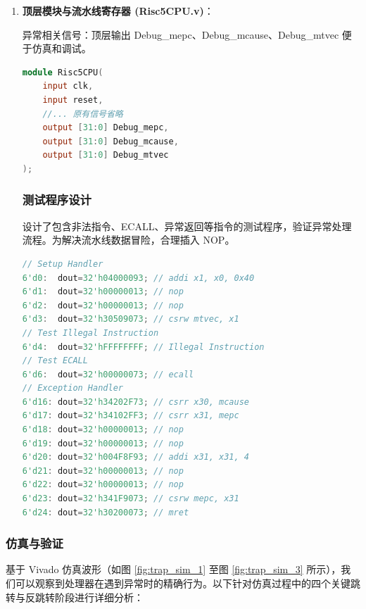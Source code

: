 \documentclass[12pt,a4paper]{article}
\begin{document}
\begin{enumerate}
    \item \textbf{顶层模块与流水线寄存器 (Risc5CPU.v)}：
   
    异常相关信号：顶层输出 Debug\_mepc、Debug\_mcause、Debug\_mtvec 便于仿真和调试。

\begin{lstlisting}[language=verilog]
module Risc5CPU(
    input clk,
    input reset,
    //... 原有信号省略
    output [31:0] Debug_mepc,
    output [31:0] Debug_mcause,
    output [31:0] Debug_mtvec
);
\end{lstlisting}

\clearpage
\subsubsection{测试程序设计}

 设计了包含非法指令、ECALL、异常返回等指令的测试程序，验证异常处理流程。为解决流水线数据冒险，合理插入 NOP。

\begin{lstlisting}[language=verilog]
// Setup Handler
6'd0:  dout=32'h04000093; // addi x1, x0, 0x40
6'd1:  dout=32'h00000013; // nop
6'd2:  dout=32'h00000013; // nop
6'd3:  dout=32'h30509073; // csrw mtvec, x1
// Test Illegal Instruction
6'd4:  dout=32'hFFFFFFFF; // Illegal Instruction
// Test ECALL
6'd6:  dout=32'h00000073; // ecall
// Exception Handler
6'd16: dout=32'h34202F73; // csrr x30, mcause
6'd17: dout=32'h34102FF3; // csrr x31, mepc
6'd18: dout=32'h00000013; // nop
6'd19: dout=32'h00000013; // nop
6'd20: dout=32'h004F8F93; // addi x31, x31, 4
6'd21: dout=32'h00000013; // nop
6'd22: dout=32'h00000013; // nop
6'd23: dout=32'h341F9073; // csrw mepc, x31
6'd24: dout=32'h30200073; // mret
\end{lstlisting}

\end{enumerate}

\subsubsection{仿真与验证}

基于 Vivado 仿真波形（如图 \ref{fig:trap_sim_1} 至图 \ref{fig:trap_sim_3} 所示），我们可以观察到处理器在遇到异常时的精确行为。以下针对仿真过程中的四个关键跳转与反跳转阶段进行详细分析：
\end{document}
